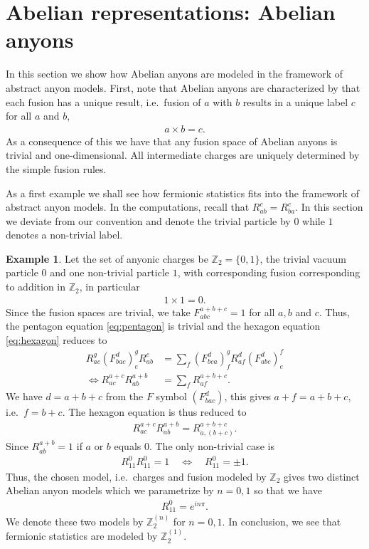 \documentclass[a4paper,10pt,oneside]{book}
\theoremstyle{plain}
\theoremstyle{definition}
\newtheorem{example}{Example}[section]
\theoremstyle{remark}
\begin{document}
\section{Abelian representations: Abelian anyons}

In this section we show how Abelian anyons are modeled in the framework of abstract anyon models. First, note that Abelian anyons are characterized by that each fusion has a unique result, i.e.\ fusion of $a$ with $b$ results in a unique label $c$ for all $a$ and $b$,
\begin{align*}
  a \times b = c.
\end{align*}
As a consequence of this we have that any fusion space of Abelian anyons is trivial and one-dimensional. All intermediate charges are uniquely determined by the simple fusion rules.

As a first example we shall see how fermionic statistics fits into the framework of abstract anyon models. In the computations, recall that $R_{ab}^c = R_{ba}^c$. In this section we deviate from our convention and denote the trivial particle by $0$ while $1$ denotes a non-trivial label.

\begin{example}
  Let the set of anyonic charges be $\mathbb{Z}_2 = \{0, 1\}$, the trivial vacuum particle $0$ and one non-trivial particle $1$, with corresponding fusion corresponding to addition in $\mathbb{Z}_2$, in particular
  \begin{align*}
    1 × 1 = 0.
  \end{align*}
  Since the fusion spaces are trivial, we take $F_{abc}^{a+b+c} = 1$ for all $a, b$ and $c$. Thus, the pentagon equation \cref{eq:pentagon} is trivial and the hexagon equation \cref{eq:hexagon} reduces to
  \begin{align*}
    R_{ac}^g \left(F_{bac}^d\right)^g_e R_{ab}^e &= \sum_{f} \left(F_{bca}^d\right)^g_f R_{af}^d \left(F_{abc}^d\right)^f_e \\
    \iff
    R_{ac}^{a+c} R_{ab}^{a+b} &= \sum_{f} R_{af}^{a+b+c}.
  \end{align*}
  We have $d = a + b + c$ from the $F$ symbol $\left(F_{bac}^d\right)$, this gives $a + f = a + b + c$, i.e.\ $f = b + c$. The hexagon equation is thus reduced to
  \begin{align*}
    R_{ac}^{a+c} R_{ab}^{a+b} = R_{a,(b+c)}^{a+b+c}.
  \end{align*}
  Since $R_{ab}^{a+b} = 1$ if $a$ or $b$ equals $0$. The only non-trivial case is
  \begin{align*}
    R_{11}^{0} R_{11}^{0} = 1 \quad \iff \quad R_{11}^{0} = ±1.
  \end{align*}
  Thus, the chosen model, i.e.\ charges and fusion modeled by $\mathbb{Z}_2$ gives two distinct Abelian anyon models which we parametrize by $n = 0, 1$ so that we have
  \begin{align*}
    R_{11}^0 = e^{inπ}.
  \end{align*}
  We denote these two models by $\mathbb{Z}_2^{(n)}$ for $n = 0, 1$. In conclusion, we see that fermionic statistics are modeled by $\mathbb{Z}_2^{(1)}$.
\end{example}
\end{document}
